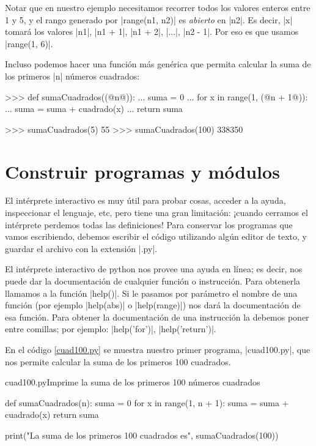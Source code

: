 Notar que en nuestro ejemplo necesitamos recorrer todos los valores enteros
entre 1 y 5, y el rango generado por |range(n1, n2)| es {\it abierto} en |n2|.
Es decir, |x| tomará los valores |n1|, |n1 + 1|, |n1 + 2|, |...|, |n2 - 1|.
Por eso es que usamos |range(1, 6)|.

Incluso podemos hacer una función más genérica que permita calcular la suma de
los primeros |n| números cuadrados:

\begin{codigo-python-sn}
>>> def sumaCuadrados((@n@)):
...     suma = 0
...     for x in range(1, (@n + 1@)):
...         suma = suma + cuadrado(x)
...     return suma

>>> sumaCuadrados(5)
55
>>> sumaCuadrados(100)
338350
\end{codigo-python-sn}

\section{Construir programas y módulos}

El intérprete interactivo es muy útil para probar cosas, acceder a la ayuda,
inspeccionar el lenguaje, etc, pero tiene una gran limitación: ¡cuando cerramos
el intérprete perdemos todas las definiciones! Para conservar los programas que
vamos escribiendo, debemos escribir el código utilizando algún editor de texto,
y guardar el archivo con la extensión |.py|.

\begin{sabias_que}
El intérprete interactivo de python nos provee una ayuda en línea; es decir,
nos puede dar la documentación de cualquier función o instrucción. Para
obtenerla llamamos a la función |help()|. Si le pasamos por parámetro el nombre
de una función (por ejemplo |help(abs)| o |help(range)|) nos dará la
documentación de esa función. Para obtener la documentación de una instrucción
la debemos poner entre comillas; por ejemplo: |help('for')|, |help('return')|.
\end{sabias_que}

En el código \ref{cuad100.py} se muestra nuestro primer programa, |cuad100.py|,
que nos permite calcular la suma de los primeros 100 cuadrados.

\begin{codigo}{cuad100.py}{Imprime la suma de los primeros 100 números
    cuadrados}
\label{cuad100.py}
\begin{codigo-python}
def sumaCuadrados(n):
    suma = 0
    for x in range(1, n + 1):
        suma = suma + cuadrado(x)
    return suma

print("La suma de los primeros 100 cuadrados es", sumaCuadrados(100))
\end{codigo-python}
\end{codigo}

